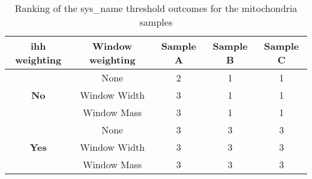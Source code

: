 \begin{table}[h!]
    \centering
    \begin{tabular}{ccccc}
    \hline
    \textbf{\gls{ihh} weighting} & \textbf{Window weighting} & \textbf{Sample A} & \textbf{Sample B} & \textbf{Sample C} \\ \hline
    \multirow{3}{*}{\textbf{No}} & None & 2 & 1 & 1 \\
    & Window Width & 3 & 1 & 1 \\ & Window Mass & 3 & 1 & 1\\ \hline
    \multirow{3}{*}{\textbf{Yes}} & None & 3 & 3 & 3 \\
    & Window Width & 3 & 3 & 3 \\ & Window Mass & 3 & 3 & 3 \\ \hline
    \end{tabular}
    \caption[Ranking of the AHT threshold outcomes for the mitochondria samples]{Ranking of the \gls{sys_name} threshold outcomes for the mitochondria samples}
    \label{tab:ihh_mito_rankings}
\end{table}
